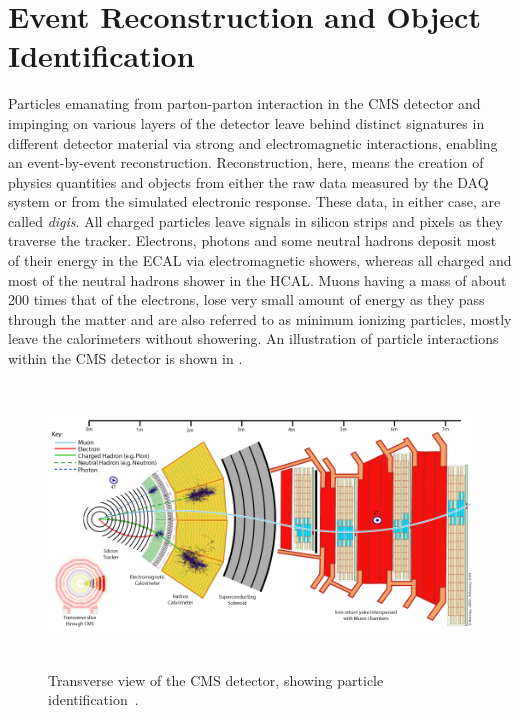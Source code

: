 \chapter{Event Reconstruction and Object Identification}\label{ch:EventReco}

Particles emanating from parton-parton interaction in the CMS detector and impinging on various layers of the detector leave behind distinct 
signatures in different detector material via strong and electromagnetic interactions, enabling an event-by-event reconstruction. Reconstruction, 
here, means the creation of physics quantities and objects from either the raw data measured by the DAQ system or from the simulated electronic 
response. These data, in either case, are called \emph{digis}. All charged particles leave signals in silicon strips and pixels as they traverse the 
tracker. Electrons, photons and some neutral hadrons deposit most of their energy in the ECAL via electromagnetic showers, whereas all charged and most 
of the neutral hadrons shower in the HCAL. Muons having a mass of about 200 times that of the electrons, lose very small amount of energy as they 
pass through the matter and are also referred to as minimum ionizing particles, mostly leave the calorimeters without showering. An illustration of 
particle interactions within the CMS detector is shown in \fig{\ref{fig:cmsSlice}}.

\begin{figure}[h]
\centering
\includegraphics[width=15cm,height=7.5cm]{ch4/figures/cmsSlice.png}
\caption{Transverse view of the CMS detector, showing particle identification~\cite{Web:CERNcds}.}
\label{fig:cmsSlice}
\end{figure}

